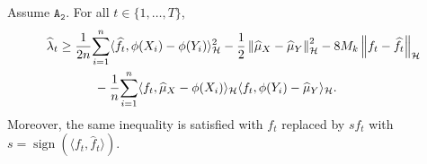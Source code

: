 \documentclass[twoside,11pt]{article}
\newcommand{\Hk}{\mathcal{H}}
\newcommand{\nb}{n}
\newcommand{\A}[1]{$\mathtt{A_#1}$}
\DeclareMathOperator{\sign}{sign}
\begin{document}
\begin{lemma}
\label{negligeble_terms}
Assume \A{2}. For all $t \in \{1,\ldots,T\}$,
\begin{align*} 
    \widehat{\lambda}_t &\geq \frac{1}{2\nb} \underset{i=1}{\overset{\nb}{\sum}} \langle \widehat{f}_t, \phi(X_i) - \phi(Y_i)\rangle_{\Hk}^2 - \frac{1}{2} \left \|  \widehat{\mu}_X - \widehat{\mu}_Y \right \|_{\Hk}^2 - 8   M_k \left \|  f_t - \widehat{f}_t \right \|_{\Hk} \\
    & \hspace{1 cm} - \frac{1}{\nb} \underset{i=1}{\overset{\nb}{\sum}} \langle f_t, \widehat{\mu}_X - \phi(X_i) \rangle_{\Hk} \langle f_t,\phi(Y_i) - \widehat{\mu}_Y  \rangle_{\Hk}. 
\end{align*}
Moreover, the same inequality is satisfied with $f_t$ replaced by $s f_t$ with $s = \sign( \langle f_t, \widehat{f}_t \rangle)$.
\end{lemma}
\end{document}
